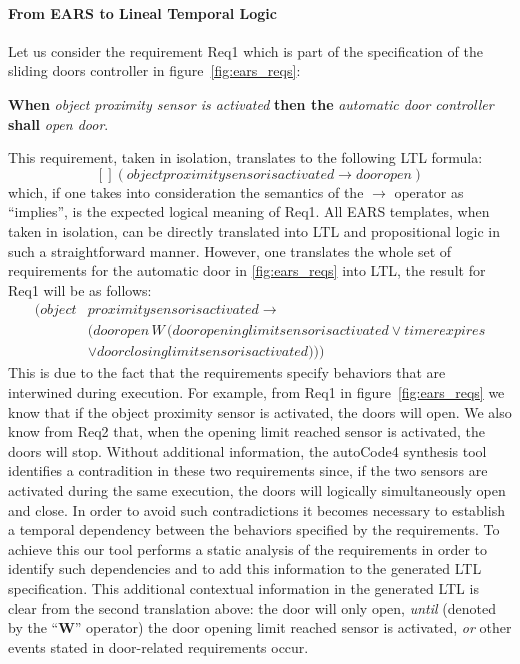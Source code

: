 \paragraph{\textbf{From EARS to Lineal Temporal Logic}\\}
\label{sec:ears_LTL} 
\hspace{-.2cm}
Let us consider the requirement \textsf{Req1} which is part of the
specification of the sliding doors controller in figure~\ref{fig:ears_reqs}:
\begin{center}
\textbf{When} \emph{object proximity sensor is activated} \textbf{then the} \emph{automatic door controller} \textbf{shall}
\emph{open door}.
\end{center}
This requirement, taken in isolation, translates to the following LTL
 formula:
$$[] (objectproximitysensorisactivated \rightarrow dooropen)$$
which, if one takes into consideration the semantics of the $\rightarrow$
operator as ``implies'', is the expected logical meaning of \textsf{Req1}. All
EARS templates, when taken in isolation, can be directly translated into LTL and
propositional logic in such a straightforward manner. However, one translates
the whole set of requirements for the automatic door in \ref{fig:ears_reqs} into
LTL, the result for \textsf{Req1} will be as follows:
\begin{align*}
[] (object&proximitysensorisactivated \rightarrow\\
 &(dooropen\,W\,(dooropeninglimitsensorisactivated \lor timerexpires\\
 & \lor doorclosinglimitsensorisactivated )))
\end{align*}
This is due to the fact that the requirements specify behaviors that are
interwined during execution. For example, from \textsf{Req1}  in
figure~\ref{fig:ears_reqs} we know that if the \textsf{object proximity sensor}
is activated, the doors will open. We also know from \textsf{Req2} that, when
the \textsf{opening limit reached} sensor is activated, the doors will stop.
Without additional information, the \textsf{autoCode4} synthesis tool identifies
a contradition in these two requirements since, if the two sensors are activated
during the same execution, the doors will logically simultaneously open and
close. In order to avoid such contradictions it becomes necessary to establish a
temporal dependency between the behaviors specified by the requirements. To
achieve this our tool performs a static analysis of the requirements in order to
identify such dependencies and to add this information to the generated LTL
specification. This additional contextual information in the generated LTL is
clear from the second translation above:
the door will only open, \emph{until} (denoted by the ``\textbf{W}'' operator)
the door \textsf{opening limit reached} sensor is activated, \emph{or} other events
stated in door-related requirements occur.\vspace{-.2cm}
